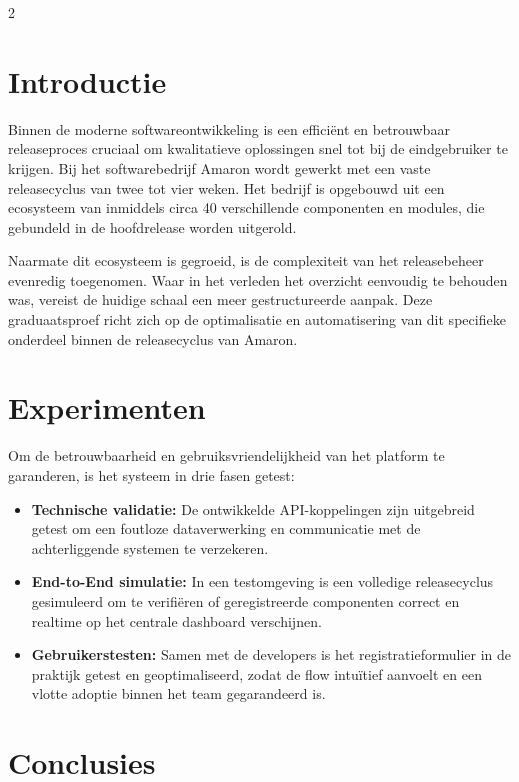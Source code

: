 \documentclass[a0,portrait]{hogent-poster}
\begin{document}
\begin{multicols}{2} 

\section{Introductie}

Binnen de moderne softwareontwikkeling is een efficiënt en betrouwbaar releaseproces cruciaal om kwalitatieve oplossingen snel tot bij de eindgebruiker te krijgen. Bij het softwarebedrijf Amaron wordt gewerkt met een vaste releasecyclus van twee tot vier weken. Het bedrijf is opgebouwd uit een ecosysteem van inmiddels circa 40 verschillende componenten en modules, die gebundeld in de hoofdrelease worden uitgerold.

Naarmate dit ecosysteem is gegroeid, is de complexiteit van het releasebeheer evenredig toegenomen. Waar in het verleden het overzicht eenvoudig te behouden was, vereist de huidige schaal een meer gestructureerde aanpak. Deze graduaatsproef richt zich op de optimalisatie en automatisering van dit specifieke onderdeel binnen de releasecyclus van Amaron.

\section{Experimenten}

Om de betrouwbaarheid en gebruiksvriendelijkheid van het platform te garanderen, is het systeem in drie fasen getest:

\begin{itemize}
  \setlength{\itemsep}{0.5em}
  \setlength{\parskip}{0pt}
  \item \textbf{Technische validatie:} De ontwikkelde API-koppelingen zijn uitgebreid getest om een foutloze dataverwerking en communicatie met de achterliggende systemen te verzekeren.
  \item \textbf{End-to-End simulatie:} In een testomgeving is een volledige releasecyclus gesimuleerd om te verifiëren of geregistreerde componenten correct en realtime op het centrale dashboard verschijnen.
  \item \textbf{Gebruikerstesten:} Samen met de developers is het registratieformulier in de praktijk getest en geoptimaliseerd, zodat de flow intuïtief aanvoelt en een vlotte adoptie binnen het team gegarandeerd is.
\end{itemize}

\section{Conclusies}


\end{multicols}
\end{document}
